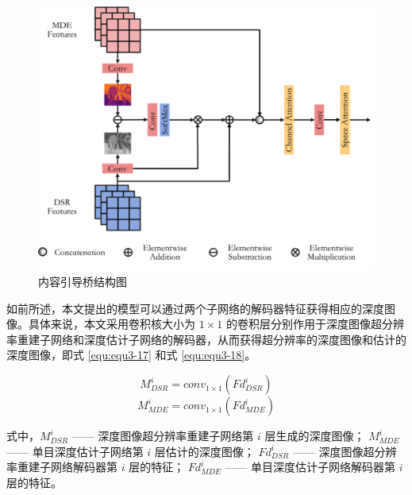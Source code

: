 \begin{figure}[!htbp]
	\centering
	\includegraphics{figures/26.png}
	\caption{内容引导桥结构图}
	\label{fig:fig3-9}
	\vspace{-0.8cm}  %
\end{figure}

\newpage

如前所述，本文提出的模型可以通过两个子网络的解码器特征获得相应的深度图像。具体来说，本文采用卷积核大小为 $1\times 1$ 的卷积层分别作用于深度图像超分辨率重建子网络和深度估计子网络的解码器，从而获得超分辨率的深度图像和估计的深度图像，即式 \ref{equ:equ3-17} 和式 \ref{equ:equ3-18}。

\vspace{-0.6cm}
\begin{equation}
	M_{DSR}^i=conv_{1\times1}\left(Fd_{DSR}^i\right)
		\label{equ:equ3-17}
\end{equation}
\vspace{-0.8cm}
\begin{equation}
	M_{MDE}^i=conv_{1\times1}\left(Fd_{MDE}^i\right)
	\label{equ:equ3-18}
\end{equation}

\noindent 式中，$M_{DSR}^i$ —— 深度图像超分辨率重建子网络第 $i$ 层生成的深度图像；\newline
\indent\quad $M_{MDE}^i$ —— 单目深度估计子网络第 $i$ 层估计的深度图像；\newline
\indent\quad $Fd_{DSR}^i$ —— 深度图像超分辨率重建子网络解码器第 $i$ 层的特征；\newline
\indent\quad $Fd_{MDE}^i$ —— 单目深度估计子网络解码器第 $i$ 层的特征。

